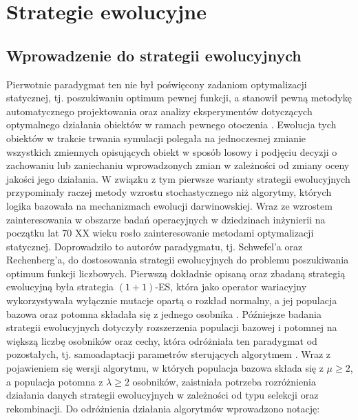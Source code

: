 \newpage

\section{Strategie ewolucyjne}
\subsection{Wprowadzenie do strategii ewolucyjnych}

    Pierwotnie paradygmat ten nie był poświęcony zadaniom optymalizacji statycznej, tj. poszukiwaniu optimum pewnej funkcji, a stanowił pewną metodykę automatycznego projektowania oraz analizy eksperymentów dotyczących optymalnego działania obiektów w ramach pewnego otoczenia \source. 
    Ewolucja tych obiektów w trakcie trwania symulacji polegała na jednoczesnej zmianie wszystkich zmiennych opisujących obiekt w sposób losowy i podjęciu decyzji o zachowaniu lub zaniechaniu wprowadzonych zmian w zależności od zmiany oceny jakości jego działania. W związku z tym pierwsze warianty strategii ewolucyjnych przypominały raczej metody wzrostu stochastycznego niż algorytmy, których logika bazowała na mechanizmach ewolucji darwinowskiej. 
    Wraz ze wzrostem zainteresowania w obszarze badań operacyjnych w dziedzinach inżynierii na początku lat 70 XX wieku rosło zainteresowanie metodami optymalizacji statycznej. Doprowadziło to autorów paradygmatu, tj. Schwefel'a oraz Rechenberg'a, do dostosowania strategii ewolucyjnych do problemu poszukiwania optimum funkcji liczbowych. Pierwszą dokładnie opisaną oraz zbadaną strategią ewolucyjną była strategia $(1+1)$-ES, która jako operator wariacyjny wykorzystywała wyłącznie mutacje opartą o rozkład normalny, a jej populacja bazowa oraz potomna składała się z jednego osobnika \source. Późniejsze badania strategii ewolucyjnych dotyczyły rozszerzenia populacji bazowej i potomnej na większą liczbę osobników oraz cechy, która odróżniała ten paradygmat od pozostałych, tj. samoadaptacji parametrów sterujących  algorytmem \source. Wraz z pojawieniem się wersji algorytmu, w których populacja bazowa składa się z $\mu \geq 2$, a populacja potomna z $\lambda \geq 2$ osobników, zaistniała potrzeba rozróżnienia działania danych strategii ewolucyjnych w zależności od typu selekcji oraz rekombinacji. Do odróżnienia działania algorytmów wprowadzono notację: 
    
